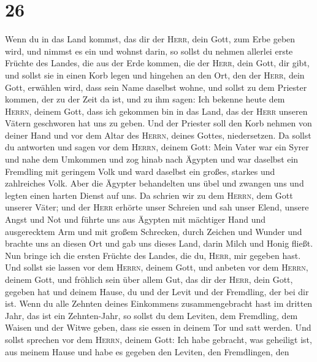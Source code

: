 \hypertarget{section-25}{%
\section{26}\label{section-25}}

 Wenn du in das Land kommst, das dir der \textsc{Herr},
dein Gott, zum Erbe geben wird, und nimmst es ein und wohnst darin,
 so sollst du nehmen allerlei erste Früchte des Landes,
die aus der Erde kommen, die der \textsc{Herr}, dein Gott, dir gibt, und
sollst sie in einen Korb legen und hingehen an den Ort, den der
\textsc{Herr}, dein Gott, erwählen wird, dass sein Name daselbst wohne,
 und sollst zu dem Priester kommen, der zu der Zeit da
ist, und zu ihm sagen: Ich bekenne heute dem \textsc{Herrn}, deinem
Gott, dass ich gekommen bin in das Land, das der \textsc{Herr} unseren
Vätern geschworen hat uns zu geben.  Und der Priester soll
den Korb nehmen von deiner Hand und vor dem Altar des \textsc{Herrn},
deines Gottes, niedersetzen.  Da sollst du antworten und
sagen vor dem \textsc{Herrn}, deinem Gott: Mein Vater war ein Syrer und
nahe dem Umkommen und zog hinab nach Ägypten und war daselbst ein
Fremdling mit geringem Volk und ward daselbst ein großes, starkes und
zahlreiches Volk.  Aber die Ägypter behandelten uns übel
und zwangen uns und legten einen harten Dienst auf uns. 
Da schrien wir zu dem \textsc{Herrn}, dem Gott unserer Väter; und der
\textsc{Herr} erhörte unser Schreien und sah unser Elend, unsere Angst
und Not  und führte uns aus Ägypten mit mächtiger Hand und
ausgerecktem Arm und mit großem Schrecken, durch Zeichen und Wunder
 und brachte uns an diesen Ort und gab uns dieses Land,
darin Milch und Honig fließt.  Nun bringe ich die ersten
Früchte des Landes, die du, \textsc{Herr}, mir gegeben hast. Und sollst
sie lassen vor dem \textsc{Herrn}, deinem Gott, und anbeten vor dem
\textsc{Herrn}, deinem Gott,  und fröhlich sein über
allem Gut, das dir der \textsc{Herr}, dein Gott, gegeben hat und deinem
Hause, du und der Levit und der Fremdling, der bei dir ist.
 Wenn du alle Zehnten deines Einkommens zusammengebracht
hast im dritten Jahr, das ist ein Zehnten-Jahr, so sollst du dem
Leviten, dem Fremdling, dem Waisen und der Witwe geben, dass sie essen
in deinem Tor und satt werden.  Und sollst sprechen vor
dem \textsc{Herrn}, deinem Gott: Ich habe gebracht, was geheiligt ist,
aus meinem Hause und habe es gegeben den Leviten, den Fremdlingen, den
